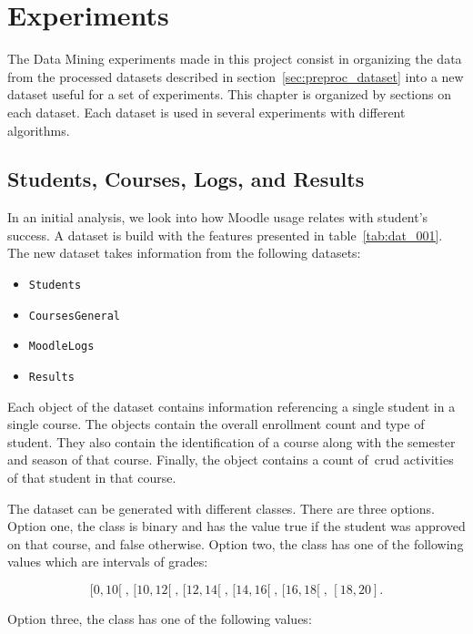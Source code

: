 \chapter{Experiments}
\label{sec:exps}

The Data Mining experiments made in this project consist in organizing the data
from the processed datasets described in section~\ref{sec:preproc_dataset} into
a new dataset useful for a set of experiments. This chapter is organized by
sections on each dataset. Each dataset is used in several experiments with
different algorithms.

\section{Students, Courses, Logs, and Results}
\label{sec:exp_001_002}

In an initial analysis, we look into how Moodle usage relates with student's
success. A dataset is build with the features presented in
table~\ref{tab:dat_001}. The new dataset takes information from the following
datasets:

\begin{itemize}
    \item \texttt{Students}
    \item \texttt{CoursesGeneral}
    \item \texttt{MoodleLogs}
    \item \texttt{Results}
\end{itemize}

Each object of the dataset contains information referencing a single student in
a single course. The objects contain the overall enrollment count and type of
student. They also contain the identification of a course along with the
semester and season of that course. Finally, the object contains a count
of~\gls{crud} activities of that student in that course.

The dataset can be generated with different classes. There are three options.
Option one, the class is binary and has the value true if the student was
approved on that course, and false otherwise. Option two, the class has one of
the following values which are intervals of grades:

\[
    [0, 10[\;,\, [10, 12[\;,\, [12, 14[\;,\, [14, 16[\;,\, [16, 18[\;,\, [18, 20].
\]

Option three, the class has one of the following values:

